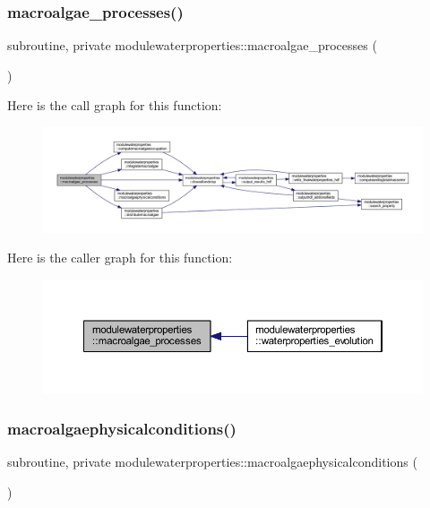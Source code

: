 \subsubsection{\texorpdfstring{macroalgae\+\_\+processes()}{macroalgae\_processes()}}
{\footnotesize\ttfamily subroutine, private modulewaterproperties\+::macroalgae\+\_\+processes (\begin{DoxyParamCaption}{ }\end{DoxyParamCaption})\hspace{0.3cm}{\ttfamily [private]}}

Here is the call graph for this function\+:\nopagebreak
\begin{figure}[H]
\begin{center}
\leavevmode
\includegraphics[width=350pt]{namespacemodulewaterproperties_aa89a84314cb0905ce7ee9f02c7c35393_cgraph}
\end{center}
\end{figure}
Here is the caller graph for this function\+:\nopagebreak
\begin{figure}[H]
\begin{center}
\leavevmode
\includegraphics[width=350pt]{namespacemodulewaterproperties_aa89a84314cb0905ce7ee9f02c7c35393_icgraph}
\end{center}
\end{figure}
\mbox{\label{namespacemodulewaterproperties_af4c3f5f2d82b97b5112ee2c44f4dc5a3}} 
\subsubsection{\texorpdfstring{macroalgaephysicalconditions()}{macroalgaephysicalconditions()}}
{\footnotesize\ttfamily subroutine, private modulewaterproperties\+::macroalgaephysicalconditions (\begin{DoxyParamCaption}{ }\end{DoxyParamCaption})\hspace{0.3cm}{\ttfamily [private]}}

